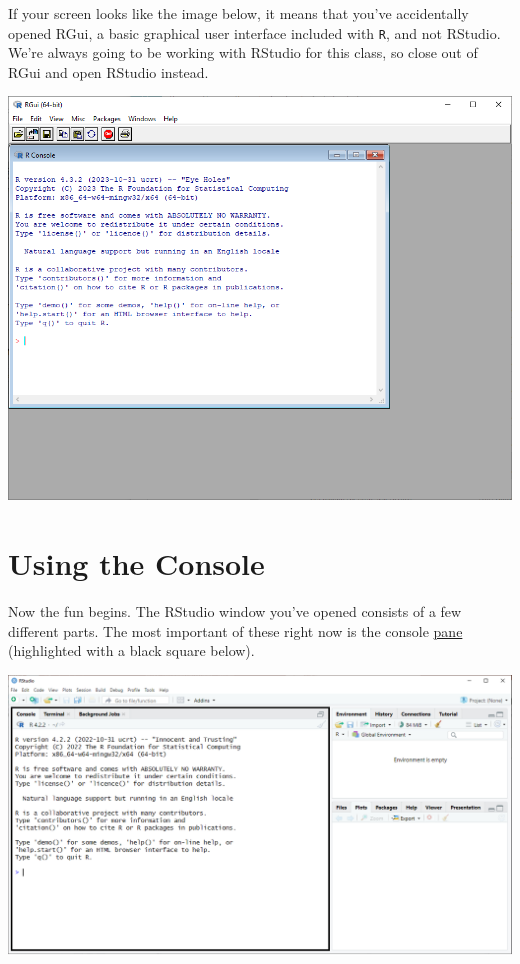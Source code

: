 \documentclass[
]{book}
\begin{document}
If your screen looks like the image below, it means that you've accidentally opened RGui, a basic graphical user interface included with \texttt{R}, and not RStudio. We're always going to be working with RStudio for this class, so close out of RGui and open RStudio instead.

\includegraphics{docs/_main_files/figure-html/Base R GUI.PNG}

\hypertarget{using-the-console}{%
\section{Using the Console}\label{using-the-console}}

Now the fun begins. The RStudio window you've opened consists of a few different parts. The most important of these right now is the console \href{https://docs.posit.co/ide/user/ide/guide/ui/ui-panes.html}{pane} (highlighted with a black square below).

\includegraphics{docs/_main_files/figure-html/RStudio console box.png}
\end{document}
